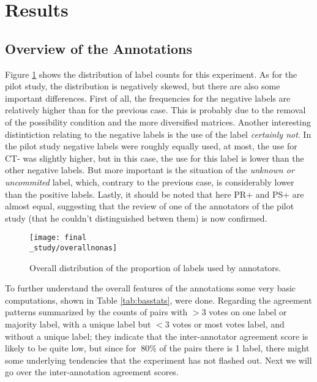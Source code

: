 \section{Results}
\subsection{Overview of the Annotations}\label{subsect:overview}
Figure \ref{fig:allbar} shows the distribution of label counts for this experiment. As for the pilot study, the distribution is negatively skewed, but there are also some important differences. First of all, the frequencies for the negative labels are relatively higher than for the previous case. This is probably due to the removal of the possibility condition and the more diversified matrices. Another interesting distintiction relating to the negative labels is the use of the label \textit{certainly not}. In the pilot study negative labels were roughly equally used, at most, the use for CT- was slightly higher, but in this case, the use for this label is lower than the other negative labels. But more important is the situation of the \textit{unknown or uncommited} label, which, contrary to the previous case, is considerably lower than the positive labels. Lastly, it should be noted that here PR+ and PS+ are almost equal, suggesting that the review of one of the annotators of the pilot study (that he couldn't distinguished betwen them) is now confirmed.\\

\begin{figure}
\centering
\parbox{10cm}{\texttt{[image: final\\\_study/overallnonas]}
\caption{Overall distribution of the proportion of labels used by annotators.}\label{fig:allbar}}
\qquad
\end{figure}

To further understand the overall features of the annotations some very basic computations, shown in Table \ref{tab:basstats}, were done. Regarding the agreement patterns summarized by the counts of pairs with $>3$ votes on one label or majority label, with a unique label but $<3$ votes or most votes label, and without a unique label; they indicate that the inter-annotator agreement score is likely to be quite low, but since for $~80\%$ of the pairs there is 1 label, there might some underlying tendencies that the experiment has not flashed out. Next we will go over the inter-annotation agreement scores.\\ 

